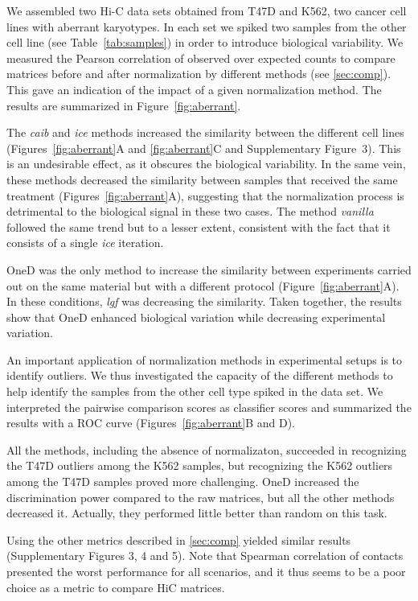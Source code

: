 \documentclass{bioinfo}
\begin{document}
We assembled two Hi-C data sets obtained from T47D and K562, two cancer
cell lines with aberrant karyotypes. In each set we spiked two
samples from the other cell line (see Table~\ref{tab:samples}) in order to
introduce biological variability. We measured the Pearson correlation of
observed over expected counts to compare matrices before and after
normalization by different methods (see \ref{sec:comp}). This gave an
indication of the impact of a given normalization method. The results are
summarized in Figure~\ref{fig:aberrant}.

The \textit{caib} and \textit{ice} methods increased the similarity
between the different cell lines (Figures~\ref{fig:aberrant}A and
\ref{fig:aberrant}C and Supplementary Figure~3). This is an undesirable
effect, as it obscures the biological variability. In the same vein, these
methods decreased the similarity between samples that received the same
treatment (Figures~\ref{fig:aberrant}A), suggesting that the normalization
process is detrimental to the biological signal in these two cases. The
method \textit{vanilla} followed the same trend but to a lesser extent,
consistent with the fact that it consists of a single \textit{ice}
iteration.

OneD was the only method to increase the similarity between experiments
carried out on the same material but with a different protocol
(Figure~\ref{fig:aberrant}A). In these conditions, \textit{lgf} was
decreasing the similarity. Taken together, the results show that OneD
enhanced biological variation while decreasing experimental variation. 

An important application of normalization methods in experimental setups
is to identify outliers. We thus investigated the capacity of the
different methods to help identify the samples from the other cell type
spiked in the data set. We interpreted the pairwise comparison scores as
classifier scores and summarized the results with a ROC curve
(Figures~\ref{fig:aberrant}B and D).

All the methods, including the absence of normalizaton, succeeded in
recognizing the T47D outliers among the K562 samples, but recognizing the
K562 outliers among the T47D samples proved more challenging. OneD
increased the discrimination power compared to the raw matrices, but all
the other methods decreased it. Actually, they performed little better
than random on this task.

Using the other metrics described in \ref{sec:comp} yielded similar
results (Supplementary Figures 3, 4 and 5). Note that Spearman correlation
of contacts presented the worst performance for all scenarios, and it thus
seems to be a poor choice as a metric to compare HiC matrices.
\end{document}
